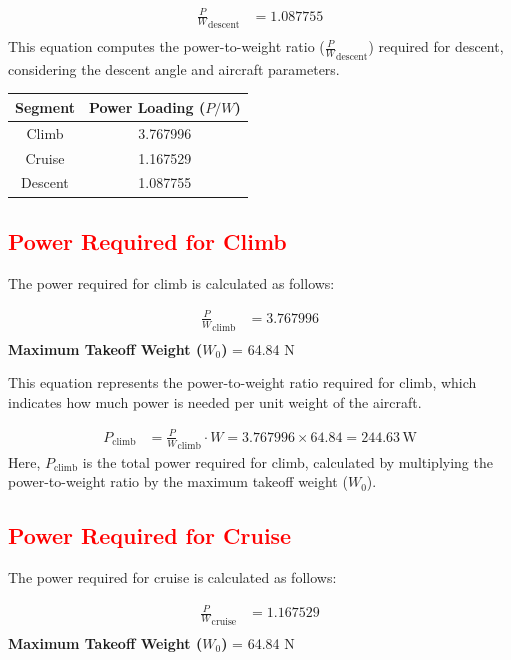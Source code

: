 \documentclass[12 pt]{article}
\begin{document}
\begin{align*}
\frac{P}{W}_{\text{descent}} &= 1.087755 \tag{3.23} \\
\end{align*}
This equation computes the power-to-weight ratio ($\frac{P}{W}_{\text{descent}}$) required for descent, considering the descent angle and aircraft parameters.

\begin{center}
\begin{tabular}{|c|c|}
\hline
Segment & Power Loading ($P/W$) \\
\hline
Climb & 3.767996 \\
Cruise & 1.167529 \\
Descent & 1.087755 \\
\hline
\end{tabular}
\end{center}

\subsection{\textcolor{red}{Power Required for Climb}}

The power required for climb is calculated as follows:

\begin{align*}
\frac{P}{W}_{\text{climb}} &= 3.767996 \tag{3.24} \\
\end{align*}
\textbf{Maximum Takeoff Weight ($W_0$)} = 64.84 N

This equation represents the power-to-weight ratio required for climb, which indicates how much power is needed per unit weight of the aircraft.

\begin{align*}
P_{\text{climb}} &= \frac{P}{W}_{\text{climb}} \cdot W = 3.767996 \times 64.84 = 244.63 \, \text{W} \tag{3.25}
\end{align*}
Here, $P_{\text{climb}}$ is the total power required for climb, calculated by multiplying the power-to-weight ratio by the maximum takeoff weight ($W_0$).

\subsection{\textcolor{red}{Power Required for Cruise}}

The power required for cruise is calculated as follows:

\begin{align*}
\frac{P}{W}_{\text{cruise}} &= 1.167529 \tag{3.26} \\
\end{align*}
\textbf{Maximum Takeoff Weight ($W_0$)} = 64.84 N
\end{document}
